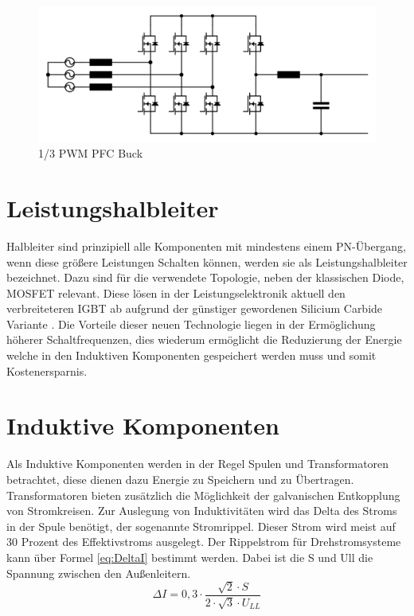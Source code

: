 \begin{figure}[H]
	\centering
	\includegraphics[width=0.9\linewidth]{content/Grafiken/B6_Buck}
	\caption[1/3 PWM PFC Buck]{1/3 PWM PFC Buck}
	\label{fig:b6buck}
\end{figure}


\section{Leistungshalbleiter}
Halbleiter sind prinzipiell alle Komponenten mit mindestens einem PN-Übergang, wenn diese größere Leistungen Schalten können, werden sie als Leistungshalbleiter bezeichnet. Dazu sind für die verwendete Topologie, neben der klassischen Diode, MOSFET relevant. Diese lösen in der Leistungselektronik aktuell den verbreiteteren IGBT ab aufgrund der günstiger gewordenen Silicium Carbide Variante \cite{SiCTrend}. Die Vorteile dieser neuen Technologie liegen in der Ermöglichung höherer Schaltfrequenzen, dies wiederum ermöglicht die Reduzierung der Energie welche in den Induktiven Komponenten gespeichert werden muss und somit Kostenersparnis. 

\section{Induktive Komponenten}
Als Induktive Komponenten werden in der Regel Spulen und Transformatoren betrachtet, diese dienen dazu Energie zu Speichern und zu Übertragen. Transformatoren bieten zusätzlich die Möglichkeit der galvanischen Entkopplung von Stromkreisen. 
Zur Auslegung von Induktivitäten wird das Delta des Stroms in der Spule benötigt, der sogenannte Stromrippel. Dieser Strom wird meist auf 30 Prozent des Effektivstroms ausgelegt. Der Rippelstrom für Drehstromsysteme kann über Formel \ref{eq:DeltaI} bestimmt werden. Dabei ist die \gls{S} und \gls{Ull} die Spannung zwischen den Außenleitern.\\
\begin{equation}
	\label{eq:DeltaI}
	 \Delta I = 0,3 \cdot \dfrac{\sqrt{2} \cdot S}{2 \cdot \sqrt{3} \cdot U_{LL}}
\end{equation}

